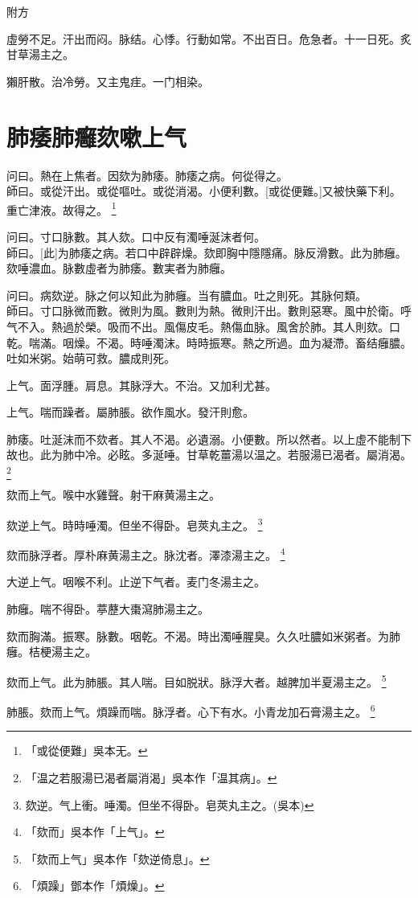 \documentclass[oneside,b4paper]{ctexbook}
\begin{document}
\begin{flushleft}
附方

虛勞不足。汗出而闷。脉结。心悸。行動如常。不出百日。危急者。十一日死。炙甘草湯主之。

獺肝散。治冷勞。又主鬼疰。一门相染。

\chapter{肺痿肺癰欬嗽上气}

问曰。熱在上焦者。因欬为肺痿。肺痿之病。何從得之。\\
師曰。或從汗出。或從嘔吐。或從消渴。小便利數。[或從便難。]又被快藥下利。重亡津液。故得之。
\footnote{「或從便難」吳本无。}

问曰。寸口脉數。其人欬。口中反有濁唾涎沫者何。\\
師曰。[此]为肺痿之病。若口中辟辟燥。欬即胸中隱隱痛。脉反滑數。此为肺癰。欬唾濃血。脉數虛者为肺痿。數実者为肺癰。

问曰。病欬逆。脉之何以知此为肺癰。当有膿血。吐之則死。其脉何類。\\
師曰。寸口脉微而數。微則为風。數則为熱。微則汗出。數則惡寒。風中於衛。呼气不入。熱過於榮。吸而不出。風傷皮毛。熱傷血脉。風舍於肺。其人則欬。口乾。喘滿。咽燥。不渴。時唾濁沫。時時振寒。熱之所過。血为凝滯。畜结癰膿。吐如米粥。始萌可救。膿成則死。

上气。面浮腫。肩息。其脉浮大。不治。又加利尤甚。

上气。喘而躁者。屬肺脹。欲作風水。發汗則愈。

肺痿。吐涎沫而不欬者。其人不渴。必遺溺。小便數。所以然者。以上虛不能制下故也。此为肺中冷。必眩。多涎唾。甘草乾薑湯以温之。若服湯已渴者。屬消渴。
\footnote{「温之若服湯已渴者屬消渴」吳本作「温其病」。}

欬而上气。喉中水雞聲。射干麻黄湯主之。

欬逆上气。時時唾濁。但坐不得卧。皂莢丸主之。
\footnote{欬逆。气上衝。唾濁。但坐不得卧。皂莢丸主之。(吳本)}

欬而脉浮者。厚朴麻黄湯主之。脉沈者。澤漆湯主之。
\footnote{「欬而」吳本作「上气」。}

大逆上气。咽喉不利。止逆下气者。麦门冬湯主之。

肺癰。喘不得卧。葶藶大棗瀉肺湯主之。

欬而胸滿。振寒。脉數。咽乾。不渴。時出濁唾腥臭。久久吐膿如米粥者。为肺癰。桔梗湯主之。

欬而上气。此为肺脹。其人喘。目如脱狀。脉浮大者。越脾加半夏湯主之。
\footnote{「欬而上气」吳本作「欬逆倚息」。}

肺脹。欬而上气。煩躁而喘。脉浮者。心下有水。小青龙加石膏湯主之。
\footnote{「煩躁」鄧本作「煩燥」。}


\end{flushleft}
\end{document}
